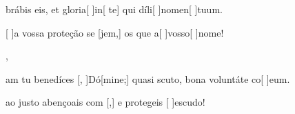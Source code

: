 {  {\item {}brábis eis, et gloria[ ]{in}[ te] qui díli[ ]{no}{men}[ ]{tu}um.~\Antiphona}%
    {\item {}[ ]{a} vossa proteção se [jem,] os que a[ ]{vos}{so}[ ]{no}me!~\Antiphona},
  {\item {}am tu benedíces [, ]{Dó}[mine;] quasi scuto, bona voluntáte co[ ]{e}um.~\Antiphona}%
    {\item {} ao justo abençoais com [,] e protegeis [ ]{es}{cu}do!~\Antiphona}
}
